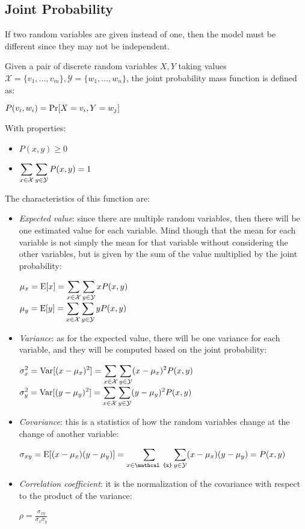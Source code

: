 \subsection{Joint Probability}
If two random variables are given instead of one, then the model must be different since they may not be independent. 
\begin{definition}
Given a pair of discrete random variables $X, Y$ taking values $\mathcal{X}=\{v_1,\hdots,v_m\}, \mathcal{Y}=\{w_1,\hdots,w_n\}$, the joint probability mass function is defined as:
\begin{center}
	$\displaystyle P(v_i,w_i)=\text{Pr}[X=v_i, Y=w_j]$
\end{center}
With properties:
\begin{itemize}
	\item $\displaystyle P(x,y)\geq 0$
	\item $\displaystyle \displaystyle\sum_{x\in\mathcal{X}}\displaystyle\sum_{y\in\mathcal{Y}}P(x,y)=1$
\end{itemize}
\end{definition}
The characteristics of this function are:
\begin{itemize}
	\item \textit{Expected value}: since there are multiple random variables, then there will be one estimated value for each variable. Mind though that the mean for each variable is not simply the mean for that variable without considering the other variables, but is given by the sum of the value multiplied by the joint probability:
		\begin{center}
			$\displaystyle \mu_x=\text{E}[x]=\displaystyle\sum_{x\in\mathcal{X}}\displaystyle\sum_{y\in\mathcal{Y}}xP(x,y)$\\
			\vspace{0.3cm}
			$\displaystyle \mu_y=\text{E}[y]=\displaystyle\sum_{x\in\mathcal{X}}\displaystyle\sum_{y\in\mathcal{Y}}yP(x,y)$
		\end{center} 
	\item \textit{Variance}: as for the expected value, there will be one variance for each variable, and they will be computed based on the joint probability:
		\begin{center}
			$\displaystyle \sigma^2_x=\text{Var}[(x-\mu_x)^2]=\displaystyle\sum_{x\in\mathcal{X}}\displaystyle\sum_{y\in\mathcal{Y}}(x-\mu_x)^2P(x,y)$\\
					\vspace{0.3cm}
			$\displaystyle \sigma^2_y=\text{Var}[(y-\mu_y)^2]=\displaystyle\sum_{x\in\mathcal{X}}\displaystyle\sum_{y\in\mathcal{Y}}(y-\mu_y)^2P(x,y)$
		\end{center}
	\item \textit{Covariance}: this is a statistics of how the random variables change at the change of another variable:
		\begin{center}
			$\displaystyle \sigma_{xy}=\E{(x-\mu_x)(y-\mu_y)}=\Sum_{x\in\mathcal{x}}\Sum_{y\in\mathcal{Y}}(x-\mu_x)(y-\mu_y)=P(x,y)$
		\end{center}
	\item \textit{Correlation coefficient}: it is the normalization of the covariance with respect to the product of the variance:
		\begin{center}
			$\displaystyle \rho=\frac{\sigma_{xy}}{\sigma_x\sigma_y}$
		\end{center}
\end{itemize}
%
